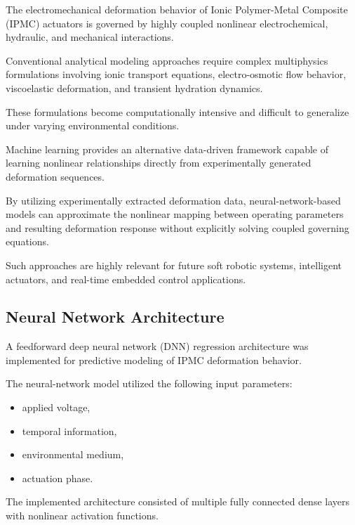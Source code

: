 \documentclass[11pt,a4paper]{article}
\begin{document}
The electromechanical deformation behavior of Ionic Polymer-Metal Composite (IPMC) actuators is governed by highly coupled nonlinear electrochemical, hydraulic, and mechanical interactions.

Conventional analytical modeling approaches require complex multiphysics formulations involving ionic transport equations, electro-osmotic flow behavior, viscoelastic deformation, and transient hydration dynamics.

These formulations become computationally intensive and difficult to generalize under varying environmental conditions.

Machine learning provides an alternative data-driven framework capable of learning nonlinear relationships directly from experimentally generated deformation sequences.

By utilizing experimentally extracted deformation data, neural-network-based models can approximate the nonlinear mapping between operating parameters and resulting deformation response without explicitly solving coupled governing equations.

Such approaches are highly relevant for future soft robotic systems, intelligent actuators, and real-time embedded control applications.

\subsection{Neural Network Architecture}

A feedforward deep neural network (DNN) regression architecture was implemented for predictive modeling of IPMC deformation behavior.

The neural-network model utilized the following input parameters:

\begin{itemize}

\item applied voltage,

\item temporal information,

\item environmental medium,

\item actuation phase.

\end{itemize}

The implemented architecture consisted of multiple fully connected dense layers with nonlinear activation functions.
\end{document}
